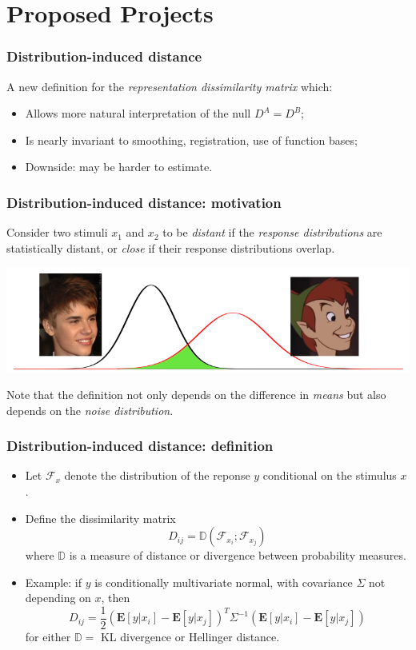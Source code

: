 \documentclass{beamer}
\newcommand{\E}{\textbf{E}}
\begin{document}
\section{Proposed Projects}

\begin{frame}
\frametitle{Distribution-induced distance}
A new definition for the \emph{representation dissimilarity matrix} which:
\begin{itemize}
\item Allows more natural interpretation of the null $D^A = D^B$;
\item Is nearly invariant to smoothing, registration, use of function bases;
\item Downside: may be harder to estimate.
\end{itemize}
\end{frame}

\begin{frame}
\frametitle{Distribution-induced distance: motivation}
Consider two stimuli $x_1$ and $x_2$ to be \emph{distant} if the \emph{response distributions} are statistically distant,
or \emph{close} if their response distributions overlap.
\begin{center}
\includegraphics[scale = 0.3]{similarity.png}
\end{center}
Note that the definition not only depends on the difference in \emph{means} but also depends on the \emph{noise distribution}.
\end{frame}

\begin{frame}
\frametitle{Distribution-induced distance: definition}
\begin{itemize}
\item Let $\mathcal{F}_x$ denote the distribution of the reponse $y$ conditional on the stimulus $x$.
\item Define the dissimilarity matrix
\[
D_{ij} = \mathbb{D}(\mathcal{F}_{x_i}; \mathcal{F}_{x_j})
\]
where $\mathbb{D}$ is a measure of distance or divergence between probability measures.
\item Example: if $y$ is conditionally multivariate normal, with covariance $\Sigma$ not depending on $x$, then
\[
D_{ij} = \frac{1}{2}(\E[y|x_i] - \E[y|x_j])^T \Sigma^{-1} (\E[y|x_i] - \E[y|x_j])
\]
for either $\mathbb{D}=$ KL divergence or Hellinger distance.
\end{itemize}
\end{frame}
\end{document}
